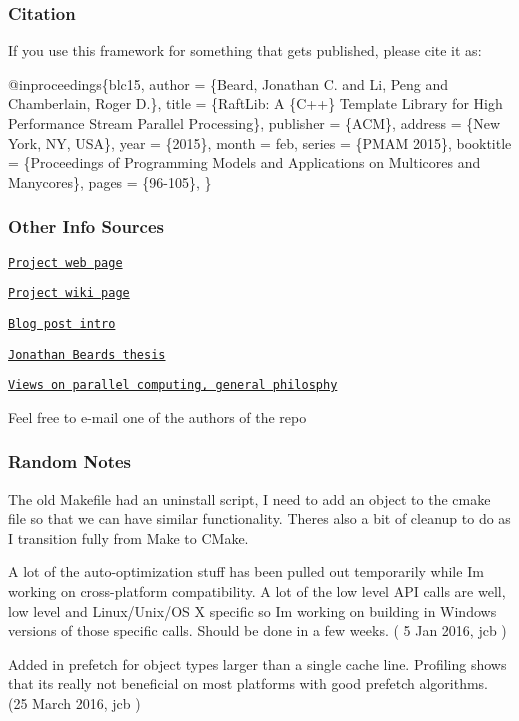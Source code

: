 \subsubsection*{Citation}

If you use this framework for something that gets published, please cite it as\+: 
\begin{DoxyCode}
@inproceedings\{blc15,
  author = \{Beard, Jonathan C. and Li, Peng and Chamberlain, Roger D.\},
  title = \{RaftLib: A \{C++\} Template Library for High Performance Stream Parallel Processing\},
  publisher = \{ACM\},
  address = \{New York, NY, USA\},
  year = \{2015\},
  month = feb,
  series = \{PMAM 2015\},
  booktitle = \{Proceedings of Programming Models and Applications on Multicores and Manycores\},
  pages = \{96-105\},
\}
\end{DoxyCode}
 \subsubsection*{Other Info Sources}


\begin{DoxyItemize}
\item \href{http://raftlib.io}{\tt Project web page}
\item \href{https://github.com/jonathan-beard/RaftLib/wiki}{\tt Project wiki page}
\item \href{https://goo.gl/4VDlbr}{\tt Blog post intro}
\item \href{http://goo.gl/obkWUh}{\tt Jonathan Beard\textquotesingle{}s thesis}
\item \href{https://goo.gl/R5fQAl}{\tt Views on parallel computing, general philosphy}
\item Feel free to e-\/mail one of the authors of the repo
\end{DoxyItemize}

\subsubsection*{Random Notes}

The old Makefile had an uninstall script, I need to add an object to the cmake file so that we can have similar functionality. Theres also a bit of cleanup to do as I transition fully from Make to C\+Make.

A lot of the auto-\/optimization stuff has been pulled out temporarily while I\textquotesingle{}m working on cross-\/platform compatibility. A lot of the low level A\+PI calls are well, low level and Linux/\+Unix/\+OS X specific so I\textquotesingle{}m working on building in Windows versions of those specific calls. Should be done in a few weeks. ( 5 Jan 2016, jcb )

Added in prefetch for object types larger than a single cache line. Profiling shows that it\textquotesingle{}s really not beneficial on most platforms with good prefetch algorithms. (25 March 2016, jcb ) 